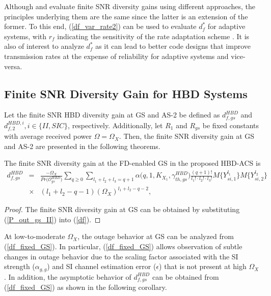 Although \cite[eq. (36)]{shin2008diversity} and \cite[eq. (5)]{narasimhan2006finite} evaluate finite SNR diversity gains using different approaches, the principles underlying them are the same since the latter is an extension of the former. To this end, (\ref{df_var_rate2}) can be used to evaluate $d_f^*$ for adaptive systems, with $r_f$ indicating the sensitivity of the rate adaptation scheme \cite{narasimhan2006finite}. It is also of interest to analyze $d_f^*$ as it can lead to better code designs that improve transmission rates at the expense of reliability for adaptive systems and vice-versa.

\subsection{Finite SNR Diversity Gain for HBD Systems}
Let the finite SNR HBD diversity gain at GS and AS-2 be defined as $d_{f,gs}^{HBD}$ and $d_{f,2}^{HBD,i}, i \in \{II,SIC\}$, respectively. Additionally, let $R_1$ and $R_{gs}$ be fixed constants with average received power $\Omega = \Omega_X$. Then, the finite SNR diversity gain at GS and AS-2 are presented in the following theorems.

\begin{theorem}
The finite SNR diversity gain at the FD-enabled GS in the proposed HBD-ACS is
\begin{eqnarray} \label{df_fixed_GS}
d_{f,gs}^{HBD} & = & \frac{-\Omega_X}{Pr\big(\mathcal{O}_{gs}^{HBD}\big)} \sum_{q\geq0}\sum_{l_1+l_2+l_3=q+1} \alpha\big(q,1,K_{X_1},\gamma_{th,gs}^{HBD}\big) \frac{(q+1)!}{l_1! \cdot l_2! \cdot l_3!} M\{Y_{si,1}^{l_1}\} M\{Y_{si,2}^{l_2}\} \nonumber\\
& \times & (l_1+l_2-q-1) \left(\Omega_X\right)^{l_1+l_2-q-2},
\end{eqnarray}
\end{theorem}
\begin{proof}
The finite SNR diversity gain at GS can be obtained by substituting (\ref{P_out_gs_II}) into (\ref{df}).
\end{proof}

At low-to-moderate $\Omega_X$, the outage behavior at GS can be analyzed from (\ref{df_fixed_GS}). In particular, (\ref{df_fixed_GS}) allows observation of subtle changes in outage behavior due to the scaling factor associated with the SI strength ($\alpha_{g,g}$) and SI channel estimation error ($\epsilon$) that is not present at high $\Omega_X$. In addition, the asymptotic behavior of $d_{f,gs}^{HBD}$ can be obtained from (\ref{df_fixed_GS}) as shown in the following corollary.

